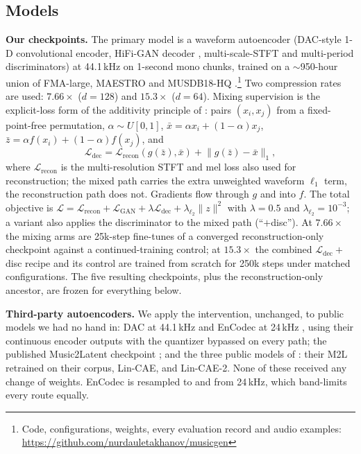 \documentclass[conference]{IEEEtran}
\newcommand{\Ldec}{\mathcal{L}_\mathrm{dec}}
\begin{document}
\subsection{Models}\label{sec:models}
\textbf{Our checkpoints.} The primary model is a waveform autoencoder
(DAC-style 1-D convolutional encoder, HiFi-GAN decoder \cite{kong2020hifigan},
multi-scale-STFT and multi-period discriminators) at 44.1\,kHz on 1-second
mono chunks, trained on a ${\sim}$950-hour union of FMA-large, MAESTRO and
MUSDB18-HQ \cite{rafii2017musdb18}.\footnote{Code, configurations, weights,
every evaluation record and audio examples:
\url{https://github.com/nurdauletakhanov/musicgen}} Two compression rates are
used: $7.66\times$ ($d{=}128$) and $15.3\times$ ($d{=}64$). Mixing
supervision is the explicit-loss form of the additivity principle of
\cite{torres2026linearity}: pairs $(x_i,x_j)$ from a fixed-point-free
permutation, $\alpha\sim U[0,1]$,
$\bar{x}=\alpha x_i{+}(1{-}\alpha)x_j$, $\bar{z}=\alpha f(x_i){+}(1{-}\alpha)f(x_j)$,
and
\begin{equation}
  \Ldec=\mathcal{L}_\mathrm{recon}\!\left(g(\bar{z}),\bar{x}\right)
        +\lVert g(\bar{z})-\bar{x}\rVert_1 ,
  \label{eq:ldec}
\end{equation}
where $\mathcal{L}_\mathrm{recon}$ is the multi-resolution STFT and mel loss
also used for reconstruction; the mixed path carries the extra unweighted
waveform $\ell_1$ term, the reconstruction path does not. Gradients flow
through $g$ and into $f$. The total objective is
$\mathcal{L}=\mathcal{L}_\mathrm{recon}+\mathcal{L}_\mathrm{GAN}+\lambda\Ldec
+\lambda_{\ell_2}\lVert z\rVert^2$ with $\lambda{=}0.5$ and
$\lambda_{\ell_2}{=}10^{-3}$; a variant also applies the discriminator to the
mixed path (``$+$disc''). At $7.66\times$ the mixing arms are 25k-step
fine-tunes of a converged reconstruction-only checkpoint against a
continued-training control; at $15.3\times$ the combined $\Ldec{+}$disc
recipe and its control are trained from scratch for 250k steps under matched
configurations. The five resulting checkpoints, plus the reconstruction-only
ancestor, are frozen for everything below.

\textbf{Third-party autoencoders.} We apply the intervention, unchanged, to
public models we had no hand in: DAC at 44.1\,kHz \cite{kumar2024dac} and
EnCodec at 24\,kHz \cite{defossez2023encodec}, using their continuous encoder
outputs with the quantizer bypassed on every path; the published Music2Latent
checkpoint \cite{pasini2024music2latent}; and the three public models of
\cite{torres2026linearity}: their M2L retrained on their corpus, Lin-CAE,
and Lin-CAE-2. None of these received any change of weights. EnCodec is
resampled to and from 24\,kHz, which band-limits every route equally.
\end{document}
